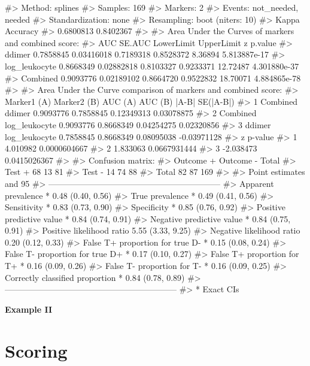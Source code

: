 \documentclass[]{article}
\renewenvironment{verbatim}{\color{codecolor}\begin{myshaded}\begin{oldverbatim}}{\end{oldverbatim}\end{myshaded}}
\begin{document}
\begin{verbatim}
#> Method: splines 
#> Samples: 169 
#> Markers: 2 
#> Events: not_needed, needed 
#> Standardization: none 
#> Resampling: boot (niters: 10)
#>  Kappa       Accuracy  
#>  0.6800813   0.8402367
#> 
#> Area Under the Curves of markers and combined score:  
#>                     AUC     SE.AUC LowerLimit UpperLimit        z      p.value
#> ddimer        0.7858845 0.03416018  0.7189318  0.8528372  8.36894 5.813887e-17
#> log_leukocyte 0.8668349 0.02882818  0.8103327  0.9233371 12.72487 4.301880e-37
#> Combined      0.9093776 0.02189102  0.8664720  0.9522832 18.70071 4.884865e-78
#> 
#> Area Under the Curve comparison of markers and combined score:  
#>   Marker1 (A)   Marker2 (B)   AUC (A)   AUC (B)      |A-B|   SE(|A-B|)
#> 1    Combined        ddimer 0.9093776 0.7858845 0.12349313  0.03078875
#> 2    Combined log_leukocyte 0.9093776 0.8668349 0.04254275  0.02320856
#> 3      ddimer log_leukocyte 0.7858845 0.8668349 0.08095038 -0.03971128
#>           z      p-value
#> 1  4.010982 0.0000604667
#> 2  1.833063 0.0667931444
#> 3 -2.038473 0.0415026367
#> 
#> Confusion matrix:  
#>           Outcome +    Outcome -      Total
#> Test +           68           13         81
#> Test -           14           74         88
#> Total            82           87        169
#> 
#> Point estimates and 95% CIs:
#> --------------------------------------------------------------
#> Apparent prevalence *                  0.48 (0.40, 0.56)
#> True prevalence *                      0.49 (0.41, 0.56)
#> Sensitivity *                          0.83 (0.73, 0.90)
#> Specificity *                          0.85 (0.76, 0.92)
#> Positive predictive value *            0.84 (0.74, 0.91)
#> Negative predictive value *            0.84 (0.75, 0.91)
#> Positive likelihood ratio              5.55 (3.33, 9.25)
#> Negative likelihood ratio              0.20 (0.12, 0.33)
#> False T+ proportion for true D- *      0.15 (0.08, 0.24)
#> False T- proportion for true D+ *      0.17 (0.10, 0.27)
#> False T+ proportion for T+ *           0.16 (0.09, 0.26)
#> False T- proportion for T- *           0.16 (0.09, 0.25)
#> Correctly classified proportion *      0.84 (0.78, 0.89)
#> --------------------------------------------------------------
#> * Exact CIs
\end{verbatim}

\textbf{Example II}

\hypertarget{scoring}{%
\section{Scoring}\label{scoring}}
\end{document}
